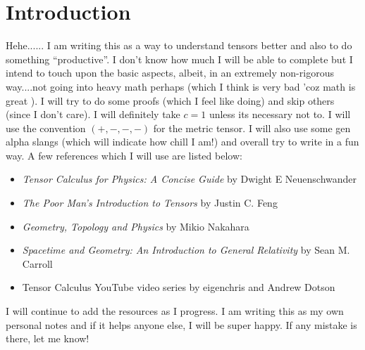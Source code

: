 \section{Introduction}
Hehe...... I am writing this as a way to understand tensors better and also to do something ``productive''. I don't know how much I will be able to complete but I intend to touch upon the basic aspects, albeit, in an extremely non-rigorous way....not going into heavy math perhaps (which I think is very bad 'coz math is great ). I will try to do some proofs (which I feel like doing) and skip others (since I don't care). I will definitely take $c=1$ unless its necessary not to. I will use the convention $(+,-,-,-)$ for the metric tensor. I will also use some gen alpha slangs (which will indicate how chill I am!) and overall try to write in a fun way. A few references which I will use are listed below:
\begin{itemize}
    \item \textit{Tensor Calculus for Physics: A Concise Guide
} by Dwight E Neuenschwander
\item \textit{The Poor Man’s Introduction to Tensors} by Justin C. Feng
\item \textit{Geometry, Topology and Physics} by Mikio Nakahara
\item \textit{Spacetime and Geometry: An Introduction to General Relativity} by Sean M. Carroll
\item Tensor Calculus YouTube video series by eigenchris and Andrew Dotson
\end{itemize}
I will continue to add the resources as I progress. I am writing this as my own personal notes and if it helps anyone else, I will be super happy. If any mistake is there, let me know! 